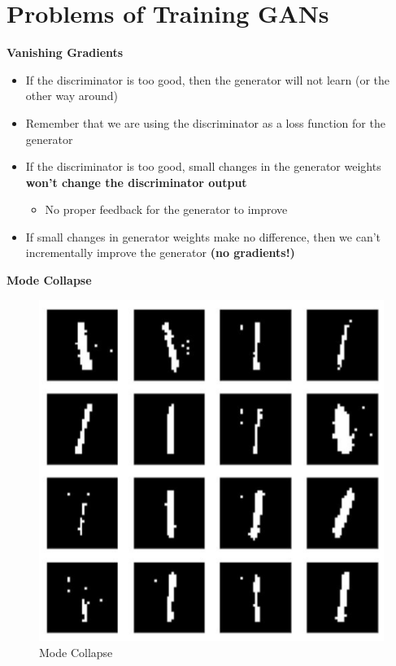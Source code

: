 \newpage

\section{Problems of Training GANs}

\textbf{Vanishing Gradients}
\begin{itemize}
    \item If the discriminator is too good, then the generator will not learn (or the other way around)
    \item Remember that we are using the discriminator as a loss function for the generator
    \item If the discriminator is too good, small changes in the generator weights \textbf{won’t change the discriminator output}
    \begin{itemize}
        \item No proper feedback for the generator to improve
    \end{itemize}
    \item If small changes in generator weights make no difference, then we can’t incrementally improve the generator \textbf{(no gradients!)}

\end{itemize}
\noindent
\textbf{Mode Collapse}

\begin{figure}[h!t]
    \centering
    \includegraphics[width=0.2\linewidth]{modecollapse.png}
    \caption{Mode Collapse}
    \label{fig:enter-label}
\end{figure}

